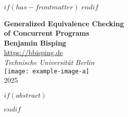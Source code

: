 $if(has-frontmatter)$
\frontmatter
$endif$
%
\begin{titlepage}
    \begin{center}
        {\huge\bfseries Generalized Equivalence Checking \\ of Concurrent Programs\\}
        \vspace{1.5cm}
        \vfill
        {\Large\bfseries Benjamin Bisping}\\[5pt]
        \url{https://bbisping.de}\\[14pt]
        \vspace{2cm}
        \emph{{Technische Universität Berlin}}\\[2cm]
        \vfill
        \texttt{[image: example-image-a]}\\[5pt]
        \vfill
        {2025}
    \end{center}
\end{titlepage}
\restoregeometry
%
$if(abstract)$
\begin{abstract}
$abstract$
\end{abstract}
$endif$